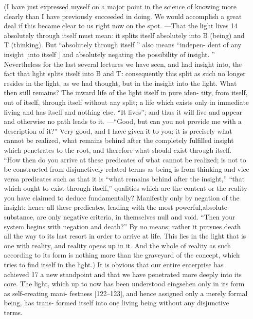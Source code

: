 (I have just expressed myself on a major point in the science of knowing
more clearly than I have previously succeeded in doing.
 We would accomplish
a great deal if this became clear to us right now on the spot.
—That the light
lives 14 absolutely through itself must mean: it splits itself absolutely into B
(being) and T (thinking).
 But “absolutely through itself ” also means “indepen-
dent of any insight [into itself ] and absolutely negating the possibility of
insight.
” Nevertheless for the last several lectures we have seen, and had insight
into, the fact that light splits itself into B and T: consequently this split as such
no longer resides in the light, as we had thought, but in the insight into the
light.
 What then still remains? The inward life of the light itself in pure iden-
tity, from itself, out of itself, through itself without any split; a life which exists
only in immediate living and has itself and nothing else.
 “It lives”; and thus it
will live and appear and otherwise no path leads to it.
—“Good, but can you not
provide me with a description of it?” Very good, and I have given it to you; it
is precisely what cannot be realized, what remains behind after the completely
fulfilled insight which penetrates to the root, and therefore what should exist
through itself.
“How then do you arrive at these predicates of what cannot be realized;
is not to be constructed from disjunctively related terms
as being is from thinking and vice versa
predicates such as that it is
“what remains behind after the insight,”
“that which ought to exist through itself,”
qualities which are the content or the reality
you have claimed to deduce fundamentally?
Manifestly only by negation of the insight:
hence all these predicates,
leading with the most powerful,absolute substance,
are only negative criteria, in themselves null and void.
“Then your system begins with negation and death?”
By no means; rather it pursues death all the way
to its last resort in order to arrive at life.
This lies in the light that is one with reality,
and reality opens up in it.
And the whole of reality as such
according to its form is
nothing more than the graveyard of the concept,
which tries to find itself in the light.)
It is obvious that our entire enterprise has achieved 17 a new standpoint
and that we have penetrated more deeply into its core.
 The light, which up to
now has been understood {eingsehen} only in its form as self-creating mani-
festness [122–123], and hence assigned only a merely formal being, has trans-
formed itself into one living being without any disjunctive terms.
